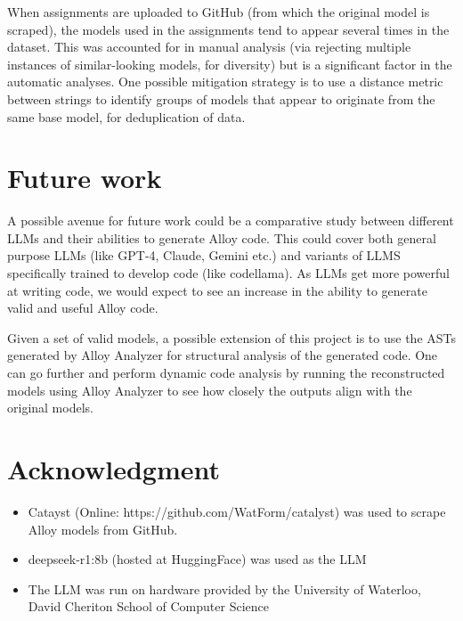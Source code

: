 \documentclass[conference]{IEEEtran}
\begin{document}
When assignments are uploaded to GitHub (from which the original model is scraped), the models used in the assignments tend to appear several times in the dataset. This was accounted for in manual analysis (via rejecting multiple instances of similar-looking models, for diversity) but is a significant factor in the automatic analyses. One possible mitigation strategy is to use a distance metric between strings to identify groups of models that appear to originate from the same base model, for deduplication of data.

\section{Future work}

A possible avenue for future work could be a comparative study between different LLMs and their abilities to generate Alloy code. This could cover both general purpose LLMs (like GPT-4, Claude, Gemini etc.) and variants of LLMS specifically trained to develop code (like codellama). As LLMs get more powerful at writing code, we would expect to see an increase in the ability to generate valid and useful Alloy code.

Given a set of valid models, a possible extension of this project is to use the ASTs generated by Alloy Analyzer for structural analysis of the generated code. One can go further and perform dynamic code analysis by running the reconstructed models using Alloy Analyzer to see how closely the outputs align with the original models.


\section{Acknowledgment}

\begin{itemize}
    \item Catayst (Online: https://github.com/WatForm/catalyst) was used to scrape Alloy models from GitHub. 
    \item deepseek-r1:8b (hosted at HuggingFace) was used as the LLM
    \item The LLM was run on hardware provided by the University of Waterloo, David Cheriton School of Computer Science
\end{itemize}
\end{document}
